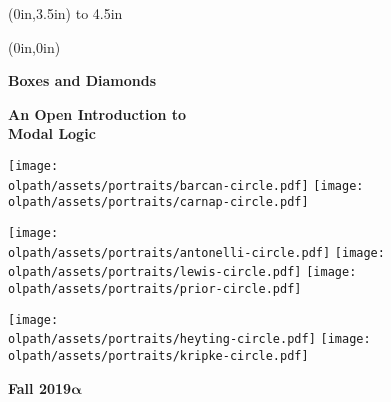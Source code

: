 

\thispagestyle{empty}

\begin{textblock*}{\stockwidth}(0in,3.5in)
  \vbox to 4.5in{\quad}
\end{textblock*}

\textblockcolor{}
\begin{textblock*}{\stockwidth}(0in,0in)
  \noindent\hfill
  \begin{minipage}[b][\stockheight][s]{.9\stockwidth}
    \begin{raggedleft}
      \vspace*{1.7cm}
      \hfill
      \sffamily\fontsize{50pt}{50pt}\selectfont
      \color{dkleadbeater}
      \textbf{Boxes and Diamonds}%
                    
      \vspace*{1cm}
      \color{black}
      \sffamily
      \fontsize{25pt}{25pt}\selectfont
      \textbf{An Open Introduction to\\ Modal Logic}
      \vskip2cm

      \hfill\texttt{[image: \\olpath/assets/portraits/barcan-circle.pdf]}
      \texttt{[image: \\olpath/assets/portraits/carnap-circle.pdf]}\hfill{}
      
      \texttt{[image: \\olpath/assets/portraits/antonelli-circle.pdf]}\hfill
      \texttt{[image: \\olpath/assets/portraits/lewis-circle.pdf]}\hfill
      \texttt{[image: \\olpath/assets/portraits/prior-circle.pdf]}
      
      \hfill\texttt{[image: \\olpath/assets/portraits/heyting-circle.pdf]}
      \texttt{[image: \\olpath/assets/portraits/kripke-circle.pdf]}\hfill{}
      
      \vspace{-.5cm}
      \fontsize{16pt}{19pt}\selectfont
      \textbf{Fall 2019$\boldsymbol{\alpha}$}\par
      \vspace{1cm}
    \end{raggedleft}
  \end{minipage}
  \hfill{}
\end{textblock*}
\ 
\newpage
\setcounter{page}{1}
\nopagecolor


